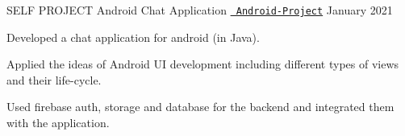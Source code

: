\begin{cventries}
  \cventry
  {SELF PROJECT}
  {Android Chat Application}
  {\texttt{\href{https://github.com/abhishekshree/Android-Project}{\faGithub{} Android-Project}}}
  {January 2021}
  {
    \begin{cvitems}
      \item Developed a chat application for android (in Java).
      \item Applied the ideas of Android UI development including different types of views and their life-cycle.
      \item Used firebase auth, storage and database for the backend and integrated them with the application.
    \end{cvitems}
  }
\end{cventries}

